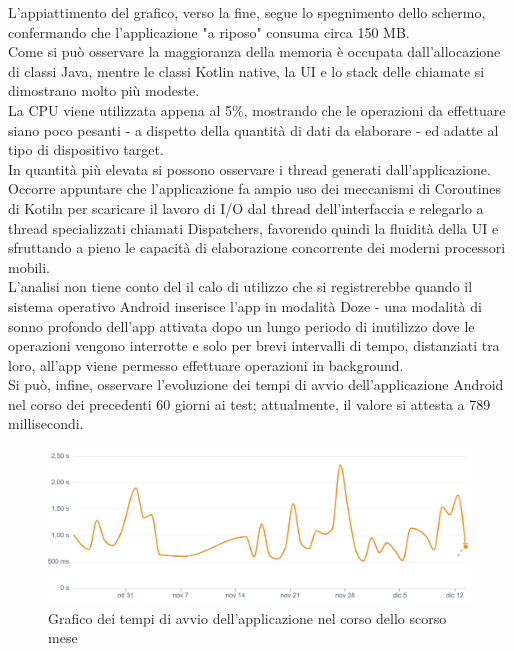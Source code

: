         L'appiattimento del grafico, verso la fine, segue lo spegnimento dello schermo, confermando che l'applicazione "a riposo" consuma circa 150 MB. \\
        Come si può osservare la maggioranza della memoria è occupata dall'allocazione di classi Java, mentre le classi Kotlin native, la UI e lo stack delle chiamate si dimostrano molto più modeste. \\
        La CPU viene utilizzata appena al 5\%, mostrando che le operazioni da effettuare siano poco pesanti - a dispetto della quantità di dati da elaborare - ed adatte al tipo di dispositivo target. \\
        In quantità più elevata si possono osservare i thread generati dall'applicazione. \\
        Occorre appuntare che l'applicazione fa ampio uso dei meccanismi di Coroutines di Kotiln per scaricare il lavoro di I/O dal thread dell'interfaccia e relegarlo a thread specializzati chiamati Dispatchers, favorendo quindi la fluidità della UI e sfruttando a pieno le capacità di elaborazione concorrente dei moderni processori mobili. \\
        L'analisi non tiene conto del il calo di utilizzo che si registrerebbe quando il sistema operativo Android inserisce l'app in modalità Doze - una modalità di sonno profondo dell'app attivata dopo un lungo periodo di inutilizzo dove le operazioni vengono interrotte e solo per brevi intervalli di tempo, distanziati tra loro, all'app viene permesso effettuare operazioni in background. \\
        Si può, infine, osservare l'evoluzione dei tempi di avvio dell'applicazione Android nel corso dei precedenti 60 giorni ai test; attualmente, il valore si attesta a 789 millisecondi.
        \begin{figure}[htbp!]
            \centering
            \includegraphics[width=1\linewidth]{Immagini/Validazione Software/TempoAvvio.png}
            \caption{Grafico dei tempi di avvio dell'applicazione nel corso dello scorso mese}
        \end{figure}
        
